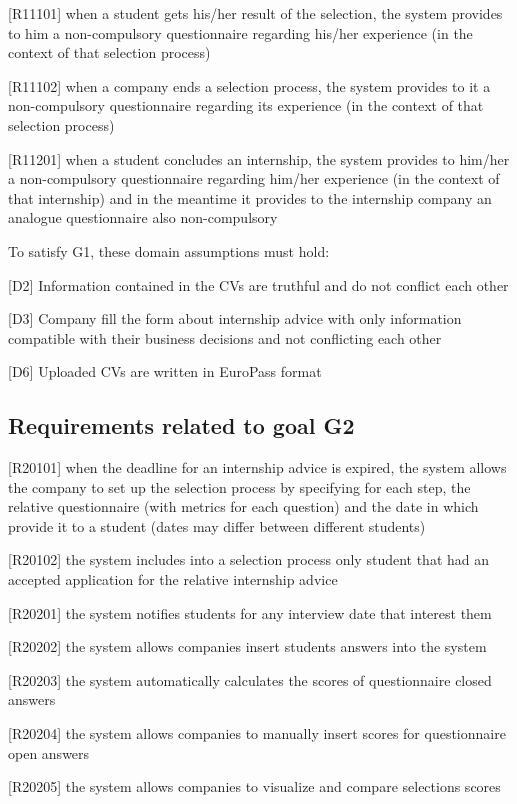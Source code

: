 		[R11101] when a student gets his/her result of the selection, the system provides to him a non-compulsory questionnaire regarding his/her experience (in the context of that selection process)
		
		[R11102] when a company ends a selection process, the system provides to it a non-compulsory questionnaire regarding its experience (in the context of that selection process) 
		
		[R11201] when a student concludes an internship, the system provides to him/her a non-compulsory questionnaire regarding him/her experience (in the context of that internship) and in the meantime it provides to the internship company an analogue questionnaire also non-compulsory 
		
		To satisfy G1, these domain assumptions must hold:
		
	
		[D2] Information contained in the CVs are truthful and do not conflict each other
		
		[D3] Company fill the form about internship advice with only information compatible with their business decisions and not conflicting each other
		
		[D6] Uploaded CVs are written in EuroPass format
		
		\subsection{Requirements related to goal G2}
		
		[R20101] when the deadline for an internship advice is expired, the system allows the company to set up the selection process by specifying for each step, the relative questionnaire (with metrics for each question) and the date in which provide it to a student (dates may differ between different students)
		
		[R20102] the system includes into a selection process only student that had an accepted application for the relative internship advice
		
		[R20201] the system notifies students for any interview date that interest them
		
		[R20202] the system allows companies insert students answers into the system
		
		[R20203] the system automatically calculates the scores of questionnaire closed answers
		
		[R20204] the system allows companies to manually insert scores for questionnaire open answers
		
		[R20205] the system allows companies to visualize and compare selections scores
		
